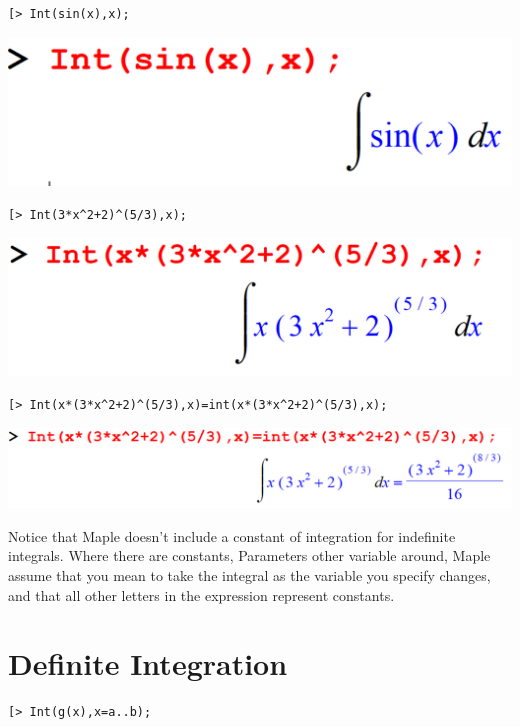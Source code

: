 \documentclass[
]{book}
\theoremstyle{definition}
\theoremstyle{definition}
\theoremstyle{definition}
\theoremstyle{definition}
\theoremstyle{remark}
\begin{document}
\begin{verbatim}
[> Int(sin(x),x);
\end{verbatim}

\includegraphics{figures/Lesson 6/fig4.png}

\begin{verbatim}
[> Int(3*x^2+2)^(5/3),x);
\end{verbatim}

\includegraphics{figures/Lesson 6/fig5.png}

\begin{verbatim}
[> Int(x*(3*x^2+2)^(5/3),x)=int(x*(3*x^2+2)^(5/3),x);
\end{verbatim}

\includegraphics{figures/Lesson 6/fig6.png}

Notice that Maple doesn't include a constant of integration for indefinite integrals.
Where there are constants, Parameters other variable around, Maple assume that you mean to take the integral as the variable you specify changes, and that all other letters in the expression represent constants.

\section{Definite Integration}\label{definite-integration}

\begin{verbatim}
[> Int(g(x),x=a..b);
\end{verbatim}
\end{document}
